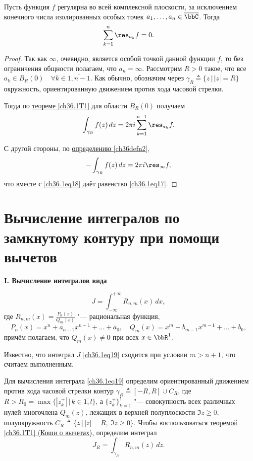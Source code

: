 \begin{cons}
Пусть функция $f$ регулярна во всей комплексной плоскости, за исключением конечного числа изолированных особых точек $a_1,\ldots,a_n \in \overline{\bbC}$. Тогда
\begin{equation} \label{ch36.1eq17}
\sum_{k = 1}^{n} \res_{a_k} f = 0.
\end{equation}
\end{cons}

\begin{proof}
Так как $\infty$, очевидно, является особой точкой данной функции $f$, то без ограничения общности полагаем, что $a_n = \infty$. Рассмотрим $R > 0$ такое, что все $a_k \in B_R(0) \quad \forall k \in \overline{1, n - 1}$. Как обычно, обозначим через $\gamma_R \triangleq \{ z \,\big|\, |z| = R\}$ окружность, ориентированную движением против хода часовой стрелки.

Тогда по \hyperref[ch36.1T1]{теореме \ref{ch36.1T1}} для области $B_R(0)$ получаем
\begin{equation} \label{ch36.1eq18}
\int_{\gamma_R} f(z) \,dz = 2\pi i \sum_{k = 1}^{n - 1} \res_{a_k} f.
\end{equation}

С другой стороны, по \hyperref[ch36defn2]{определению \ref{ch36defn2}},
$$
- \int_{\gamma_R} f(z) \,dz = 2\pi i \res_{\infty} f,
$$
что вместе с \eqref{ch36.1eq18} даёт равенство \eqref{ch36.1eq17}.
\end{proof}

\section{Вычисление интегралов по замкнутому контуру при помощи вычетов}

{\bf I. Вычисление интегралов вида}

\begin{equation} \label{ch36.1eq19}
J = \int_{-\infty}^{+\infty} R_{n,m} (x)\, dx,
\end{equation}
где $R_{n,m}(x) = \frac{P_n(x)}{Q_m(x)}$ "--- рациональная функция,
$$
P_n(x) = x^n + a_{n - 1} x^{n - 1} + \ldots + a_0, \quad
Q_m(x) = x^m + b_{m - 1} x^{m - 1} + \ldots + b_0,
$$
причём полагаем, что $Q_m(x) \not= 0$ при всех $x \in \bbR^1$.

Известно, что интеграл $J$ \eqref{ch36.1eq19} сходится при условии $m > n + 1$, что считаем выполненным.

Для вычисления интеграла \eqref{ch36.1eq19} определим ориентированный движением против хода часовой стрелки контур $\gamma_R \triangleq [-R, R] \cup C_R$, где $R > R_0 = \max\{ |z_k^{+}| \,\big|\, k \in \overline{1,l} \}$, а $ \{ z_{k}^{+} \}^l_{k = 1}$ "--- совокупность всех различных нулей многочлена $Q_m(z)$, лежащих в верхней полуплоскости $\Im z \ge 0$, полуокружность $C_R \triangleq \{ z \,\big|\, |z| = R, \ \Im z \ge 0 \}$. Чтобы воспользоваться \hyperref[ch36.1T1]{теоремой \ref{ch36.1T1} (Коши о вычетах)}, определим интеграл 
$$
J_R = \int_{\gamma_R} R_{n,m}(z)\,dz.
$$


